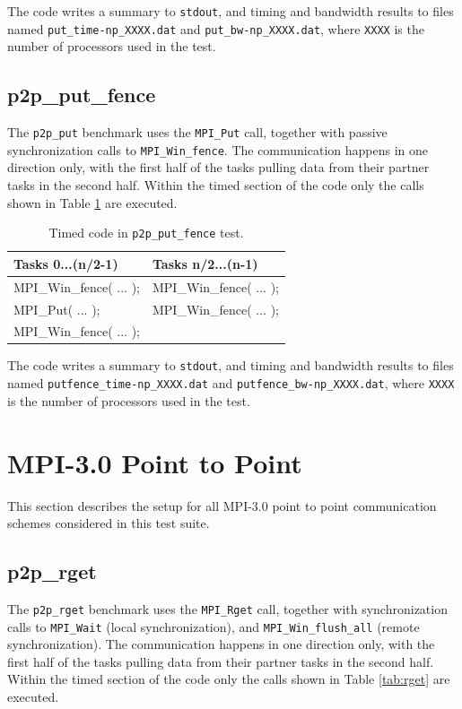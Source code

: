 \documentclass[10pt,a4paper]{report}
\begin{document}
The code writes a summary to \verb+stdout+, and timing and bandwidth results to files named \verb+put_time-np_XXXX.dat+ and \verb+put_bw-np_XXXX.dat+, where \verb+XXXX+ is the number of processors used in the test.

\FloatBarrier
\subsection{p2p\_put\_fence}
The \verb+p2p_put+ benchmark uses the \verb+MPI_Put+ call, together with passive synchronization calls to \verb+MPI_Win_fence+. The communication happens in one direction only, with the first half of the tasks pulling data from their partner tasks in the second half. Within the timed section of the code only the calls shown in Table \ref{tab:put_fence} are executed.

\begin{table}[ht]
\centering
\caption{Timed code in \texttt{p2p\_put\_fence} test.}
\label{tab:put_fence}
\begin{tabular}{|l|l|}
\hline
\bf{Tasks 0...(n/2-1)}	   & \bf{Tasks n/2...(n-1)}\\\hline
MPI\_Win\_fence( ... );    & MPI\_Win\_fence( ... );\\
MPI\_Put( ... );           & MPI\_Win\_fence( ... );\\
MPI\_Win\_fence( ... ); & \\\hline
\end{tabular}
\end{table}

The code writes a summary to \verb+stdout+, and timing and bandwidth results to files named \verb+putfence_time-np_XXXX.dat+ and \verb+putfence_bw-np_XXXX.dat+, where \verb+XXXX+ is the number of processors used in the test.

\FloatBarrier
\section{MPI-3.0 Point to Point}
This section describes the setup for all MPI-3.0 point to point communication schemes considered in this test suite.

\subsection{p2p\_rget}
The \verb+p2p_rget+ benchmark uses the \verb+MPI_Rget+ call, together with synchronization calls to \verb+MPI_Wait+ (local synchronization), and \verb+MPI_Win_flush_all+ (remote synchronization). The communication happens in one direction only, with the first half of the tasks pulling data from their partner tasks in the second half. Within the timed section of the code only the calls shown in Table \ref{tab:rget} are executed.
\end{document}
